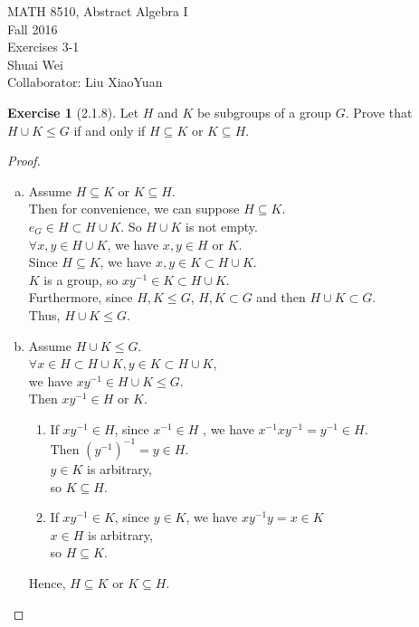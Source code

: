 \documentclass{amsart}
\theoremstyle{plain}
\theoremstyle{definition}
\newtheorem{exer}[lem]{Exercise}
\begin{document}
\noindent MATH 8510, Abstract Algebra I \\
Fall 2016\\
Exercises 3-1\\
Shuai Wei \\
Collaborator: Liu XiaoYuan
\

%
%

\begin{exer}[2.1.8]
Let $H$ and $K$ be subgroups of a group $G$.
Prove that $H\cup K\leq G$ if and only if $H\subseteq K$ or $K\subseteq H$.

\begin{proof}
	\begin{enumerate}[(a)]
	\item 
		Assume $H\subseteq K$ or $K\subseteq H$.\\
		Then for convenience, we can suppose $H\subseteq K$. \\
		$e_G \in H \subset H \cup K$. So $H\cup K$ is not empty. \\
		$\forall x,y\in H \cup K$, we have $x, y \in H$ or $K$.\\
		Since $H \subseteq K$, we have $x,y \in K \subset H\cup K$.\\
		$K$ is a group, so $xy^{-1} \in K \subset H\cup K$.\\
		Furthermore, since $H, K \leq G$, $H,K \subset G$ and then $H \cup K \subset G$.\\
		Thus, $H\cup K \leq G$.
	\item 
		Assume $H\cup K\leq G$. \\
		$\forall x \in H \subset H\cup K , y \in K \subset H\cup K$,\\
		we have $xy^{-1} \in H\cup K\leq G$. \\
		Then $xy^{-1}\in H$ or $K$.
		\begin{enumerate}[(1)]
			\item If $xy^{-1} \in H$, since $x^{-1} \in H$ , we have $x^{-1}xy^{-1} = y^{-1} \in H$. \\
				Then $(y^{-1})^{-1} = y\in H$.\\
				$y \in K$ is arbitrary,\\
				so $K \subseteq H$.
			\item If $xy^{-1} \in K$, since $y \in K$, we have $xy^{-1}y = x \in K$\\
				$x \in H$ is arbitrary,\\
				so $H \subseteq K$.
		\end{enumerate}
		Hence, $H\subseteq K$ or $K\subseteq H$.
	\end{enumerate}
\end{proof}



\end{exer}
\end{document}
